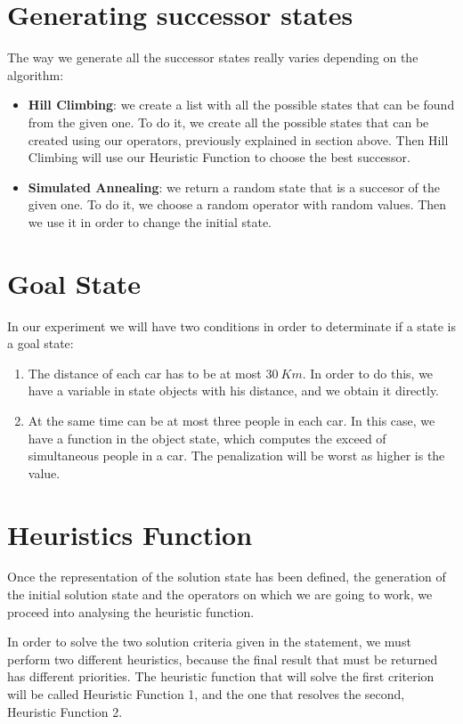 \documentclass[12]{article}
\begin{document}
\section{Generating successor states}
The way we generate all the successor states really varies depending on the algorithm:
\begin{itemize}
\item \textbf{Hill Climbing}: we create a list with all the possible states that can be found from the given one. To do it, we create all the possible states that can be created using our operators, previously explained in section above. Then Hill Climbing will use our Heuristic Function to choose the best successor.
\item \textbf{Simulated Annealing}: we return a random state that is a succesor of the given one. To do it, we choose a random operator with random values. Then we use it in order to change the initial state.  
\end{itemize}

\section{Goal State}

In our experiment we will have two conditions in order to determinate if a state is a goal state:

\begin{enumerate}
  \item The distance of each car has to be at most $30\ Km$. In order to do this, we have a variable in state objects with his distance, and we obtain it directly.
  \item At the same time can be at most three people in each car. In this case, we have a function in the object state, which computes the exceed of simultaneous people in a car. The penalization will be worst as higher is the value.
\end{enumerate}

\section{Heuristics Function}
Once the representation of the solution state has been defined, the generation of the initial solution state and the operators on which we are going to work, we proceed into analysing the heuristic function. 

In order to solve the two solution criteria given in the statement, we must perform two different heuristics, because the final result that must be returned has different priorities. The heuristic function that will solve the first criterion will be called Heuristic Function 1, and the one that resolves the second, Heuristic Function 2. 
\end{document}
